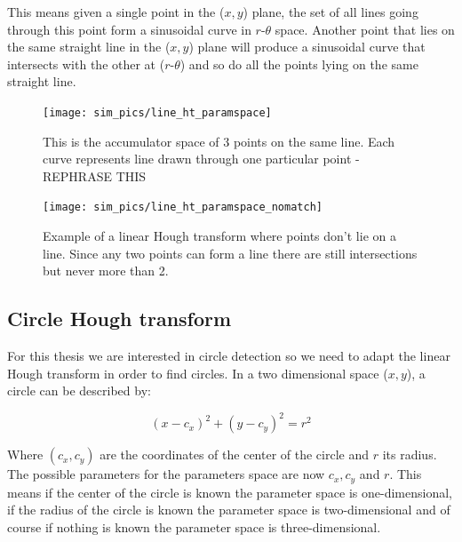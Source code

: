 \documentclass[11pt]{scrreprt}
\begin{document}
This means given a single point in the ($x,y$) plane, the set of all lines going through this point form a sinusoidal curve in 
$r\text{-}\theta$ space. Another point that lies on the same straight line in the ($x,y$) plane will produce a sinusoidal curve that 
intersects with the other at ($r\text{-}\theta$) and so do all the points lying on the same straight line. 


\begin{figure}[tb]
  \centering
  \texttt{[image: sim\_pics/line\_ht\_paramspace]}
  \caption[Example of a linear HT space]{This is the accumulator space of 3 points on the same line. Each curve represents line drawn through one particular point - REPHRASE THIS}
  \label{fig:line_ht}
\end{figure}

\begin{figure}[tb]
  \centering
  \texttt{[image: sim\_pics/line\_ht\_paramspace\_nomatch]}
  \caption[Example of a linear HT where points don't lie on a line]{Example of a linear Hough transform where points don't lie on a line. Since any 
  two points can form a line there are still intersections but never more than 2.}
  \label{fig:line_ht_nomatch}
\end{figure}

\subsection{Circle Hough transform} %
\label{sub:circle_hough_transform}

For this thesis we are interested in circle detection so we need to adapt the linear Hough transform in order to find circles. 
In a two dimensional space ($x,y$), a circle can be described by:

\begin{equation}
		(x-c_x)^2 + (y-c_y)^2 = r^2
\end{equation}

Where $(c_x,c_y)$ are the coordinates of the center of the circle and $r$ its radius. The possible parameters for the parameters space are now $c_x, c_y$ and $r$. This means if the center of the circle is known the parameter space is one-dimensional, if the radius of the circle is known the parameter space is two-dimensional and of course if nothing is known the parameter space is three-dimensional.



\end{document}
